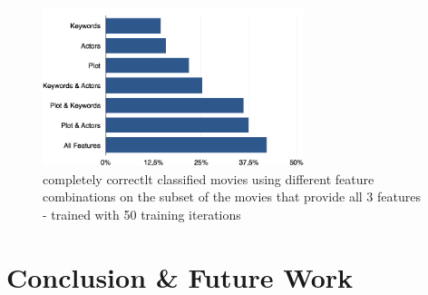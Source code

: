 \documentclass{vldb}
\begin{document}
\begin{figure}
\begin{center}
\includegraphics[width=3.00in]{FeatureCombinations.png}
\caption{completely correctlt classified movies using different feature combinations on the subset of the movies that provide all 3 features - trained with 50 training iterations}
\label{fig:FeatureCombinations}
\end{center}
\end{figure}



\section{Conclusion \& Future Work}
\end{document}
